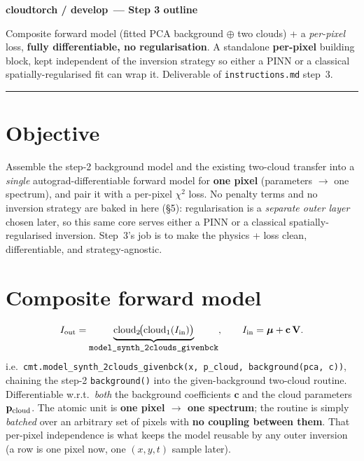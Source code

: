 \documentclass[10pt,a4paper]{article}
\newcommand{\co}[1]{{\small\texttt{#1}}}
\begin{document}
\small

{\sffamily\bfseries\large\color{acc} cloudtorch / develop\, --- Step 3 outline}

\vspace{1pt}
{\sffamily\color{gry}\footnotesize Composite forward model (fitted PCA background $\oplus$ two clouds) + a \emph{per-pixel} loss, \textbf{fully differentiable, no regularisation}. A standalone \textbf{per-pixel} building block, kept independent of the inversion strategy so either a PINN or a classical spatially-regularised fit can wrap it. Deliverable of \co{instructions.md} step~3.}

\vspace{1pt}
{\footnotesize\color{gry}\rule{\textwidth}{0.4pt}}

\section{Objective}

Assemble the step-2 background model and the existing two-cloud transfer into a \emph{single} autograd-differentiable forward model for \textbf{one pixel} (parameters $\rightarrow$ one spectrum), and pair it with a per-pixel $\chi^2$ loss. No penalty terms and no inversion strategy are baked in here (\S5): regularisation is a \emph{separate outer layer} chosen later, so this same core serves either a PINN or a classical spatially-regularised inversion. Step~3's job is to make the physics + loss clean, differentiable, and strategy-agnostic.

\section{Composite forward model}

\[
I_{\rm out}=\underbrace{\mathrm{cloud}_2\!\big(\mathrm{cloud}_1(I_{\rm in})\big)}_{\text{\co{model\_synth\_2clouds\_givenbck}}},\qquad
I_{\rm in}=\boldsymbol\mu+\mathbf c\,\mathbf V .
\]
i.e.\ \co{cmt.model\_synth\_2clouds\_givenbck(x, p\_cloud, background(pca, c))}, chaining the step-2 \co{background()} into the given-background two-cloud routine. Differentiable w.r.t.\ \emph{both} the background coefficients $\mathbf c$ and the cloud parameters $\mathbf p_{\rm cloud}$. The atomic unit is \textbf{one pixel $\rightarrow$ one spectrum}; the routine is simply \emph{batched} over an arbitrary set of pixels with \textbf{no coupling between them}. That per-pixel independence is what keeps the model reusable by any outer inversion (a row is one pixel now, one $(x,y,t)$ sample later).
\end{document}

